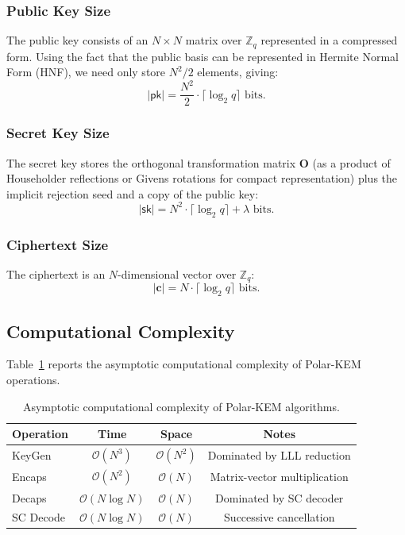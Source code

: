 \documentclass[11pt,a4paper]{article}
\newcommand{\polarKem}{\textsf{Polar-KEM}\xspace}
\newcommand{\Z}{\mathbb{Z}}
\newcommand{\pk}{\mathsf{pk}}
\newcommand{\sk}{\mathsf{sk}}
\begin{document}
\subsubsection{Public Key Size}

The public key consists of an $N \times N$ matrix over $\Z_q$ represented in a compressed form. Using the fact that the public basis can be represented in Hermite Normal Form (HNF), we need only store $N^2 / 2$ elements, giving:
\[
|\pk| = \frac{N^2}{2} \cdot \lceil \log_2 q \rceil \text{ bits}.
\]

\subsubsection{Secret Key Size}

The secret key stores the orthogonal transformation matrix $\mathbf{O}$ (as a product of Householder reflections or Givens rotations for compact representation) plus the implicit rejection seed and a copy of the public key:
\[
|\sk| = N^2 \cdot \lceil \log_2 q \rceil + \lambda \text{ bits}.
\]

\subsubsection{Ciphertext Size}

The ciphertext is an $N$-dimensional vector over $\Z_q$:
\[
|\mathbf{c}| = N \cdot \lceil \log_2 q \rceil \text{ bits}.
\]

\subsection{Computational Complexity}\label{sec:complexity}

Table~\ref{tab:complexity} reports the asymptotic computational complexity of \polarKem operations.

\begin{table}[H]
\centering
\caption{Asymptotic computational complexity of \polarKem algorithms.}
\label{tab:complexity}
\begin{tabular}{@{}lccc@{}}
\toprule
\textbf{Operation} & \textbf{Time} & \textbf{Space} & \textbf{Notes} \\
\midrule
KeyGen & $\mathcal{O}(N^3)$ & $\mathcal{O}(N^2)$ & Dominated by LLL reduction \\
Encaps & $\mathcal{O}(N^2)$ & $\mathcal{O}(N)$ & Matrix-vector multiplication \\
Decaps & $\mathcal{O}(N \log N)$ & $\mathcal{O}(N)$ & Dominated by SC decoder \\
SC Decode & $\mathcal{O}(N \log N)$ & $\mathcal{O}(N)$ & Successive cancellation \\
\bottomrule
\end{tabular}
\end{table}
\end{document}
